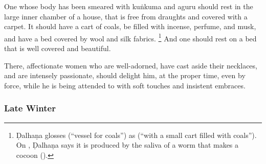 \begin{translation}
\item[30--31] 
One whose body has been smeared with \gls{kuṅkuma} and \gls{aguru} %
should rest %
in the large %
inner chamber of a house,  %
that is free from draughts %
and covered with a carpet. %
It should have a cart of coals, %
be filled with incense, perfume, and musk,  %
and have a bed covered by wool and silk fabrics.%
    \footnote{%
    Ḍalhaṇa \citep[810]{vulgate} glosses  (``vessel for coals'') as  (``with a small cart filled with coals''). On , Ḍalhaṇa \citep[86]{vulgate} says it is produced by the saliva of a worm that makes a cocoon ().
    } %
And one should rest on a bed that is %
well covered %
and beautiful. %

\item[32] %
There, %
affectionate %
women who are well-adorned, %
have cast aside their necklaces, %
and are intensely passionate, %
should delight him, %
at the proper time, %
even by force, %
while he is being attended to %
with soft touches %
and insistent embraces. %


\subsubsection{Late Winter}


\end{translation}
